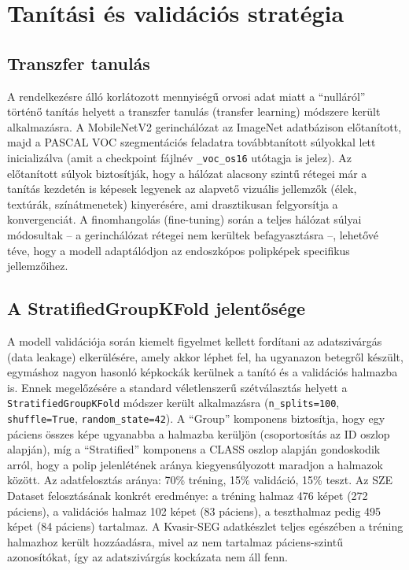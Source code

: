 \documentclass[12pt, a4paper]{report}
\begin{document}
\section{Tanítási és validációs stratégia}

\subsection{Transzfer tanulás}
A rendelkezésre álló korlátozott mennyiségű orvosi adat miatt a ``nulláról'' történő tanítás helyett a transzfer tanulás (transfer learning) módszere került alkalmazásra. A MobileNetV2 gerinchálózat az ImageNet adatbázison előtanított, majd a PASCAL VOC szegmentációs feladatra továbbtanított súlyokkal lett inicializálva (amit a checkpoint fájlnév \texttt{\_voc\_os16} utótagja is jelez). Az előtanított súlyok biztosítják, hogy a hálózat alacsony szintű rétegei már a tanítás kezdetén is képesek legyenek az alapvető vizuális jellemzők (élek, textúrák, színátmenetek) kinyerésére, ami drasztikusan felgyorsítja a konvergenciát. A finomhangolás (fine-tuning) során a teljes hálózat súlyai módosultak -- a gerinchálózat rétegei nem kerültek befagyasztásra --, lehetővé téve, hogy a modell adaptálódjon az endoszkópos polipképek specifikus jellemzőihez.

\subsection{A StratifiedGroupKFold jelentősége}
A modell validációja során kiemelt figyelmet kellett fordítani az adatszivárgás (data leakage) elkerülésére, amely akkor léphet fel, ha ugyanazon betegről készült, egymáshoz nagyon hasonló képkockák kerülnek a tanító és a validációs halmazba is. Ennek megelőzésére a standard véletlenszerű szétválasztás helyett a \texttt{StratifiedGroupKFold} módszer került alkalmazásra (\texttt{n\_splits=100}, \texttt{shuffle=True}, \texttt{random\_state=42}). A ``Group'' komponens biztosítja, hogy egy páciens összes képe ugyanabba a halmazba kerüljön (csoportosítás az ID oszlop alapján), míg a ``Stratified'' komponens a CLASS oszlop alapján gondoskodik arról, hogy a polip jelenlétének aránya kiegyensúlyozott maradjon a halmazok között. Az adatfelosztás aránya: 70\% tréning, 15\% validáció, 15\% teszt. Az SZE Dataset felosztásának konkrét eredménye: a tréning halmaz 476 képet (272 páciens), a validációs halmaz 102 képet (83 páciens), a teszthalmaz pedig 495 képet (84 páciens) tartalmaz. A Kvasir-SEG adatkészlet teljes egészében a tréning halmazhoz került hozzáadásra, mivel az nem tartalmaz páciens-szintű azonosítókat, így az adatszivárgás kockázata nem áll fenn.
\end{document}
